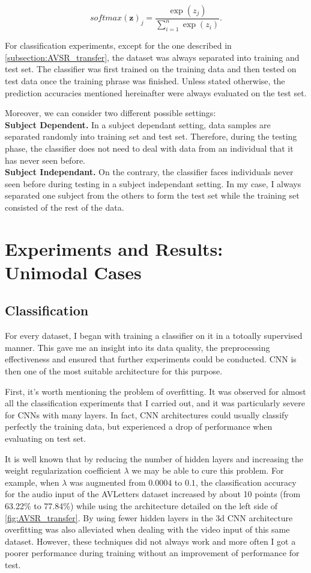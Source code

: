 \[softmax(\mathbf{z})_j = \frac{\exp(z_j)}{\sum_{i=1}^n\exp(z_i)}.\]

For classification experiments, except for the one described in
\ref{subsection:AVSR_transfer}, the dataset was always separated into
training and test set. The classifier was first trained on the training data
and then tested on test data once the training phrase was finished.
Unless stated otherwise, the prediction accuracies mentioned hereinafter
were always evaluated on the test set.

Moreover, we can consider two different possible settings:\\[0.35em]
\textbf{Subject Dependent.}
In a subject dependant setting, data samples are separated randomly into
training set and test set. Therefore, during the
testing phase, the classifier does not need to deal with data from an
individual that it has never seen before.\\[0.35em]
\textbf{Subject Independant.}
On the contrary, the classifier faces individuals never seen before
during testing in a subject independant setting. 
In my case, I always separated one subject from the others to form
the test set while the training set consisted of the rest of the data.

\section{Experiments and Results: Unimodal Cases} \label{section:uni}

\subsection{Classification} \label{subsection:classif}

For every dataset, I began with training a classifier on it in a
totoally supervised manner.
This gave me an insight into its data quality, the preprocessing
effectiveness and ensured that further experiments could be conducted.
CNN is then one of the most suitable architecture for this purpose.

First, it's worth mentioning the problem of overfitting.
It was observed for almost all the classification experiments that I
carried out, and it was particularly severe for CNNs with many layers.
In fact, CNN architectures could usually classify
perfectly the training data, but experienced a drop of performance
when evaluating on test set.

It is well known that by reducing the number of hidden layers and
increasing the weight regularization coefficient $\lambda$ we may
be able to cure this problem.
For example, when $\lambda$ was augmented from $0.0004$ to $0.1$,
the classification accuracy for the audio input of the AVLetters
dataset increased by about 10 points
(from 63.22\% to 77.84\%) while using the architecture detailed on
the left side of \autoref{fig:AVSR_transfer}.
By using fewer hidden layers in the 3d CNN architecture overfitting
was also alleviated when dealing with the video input of this same dataset.
However, these techniques did not always work
and more often I got a poorer performance during training without
an improvement of performance for test.

